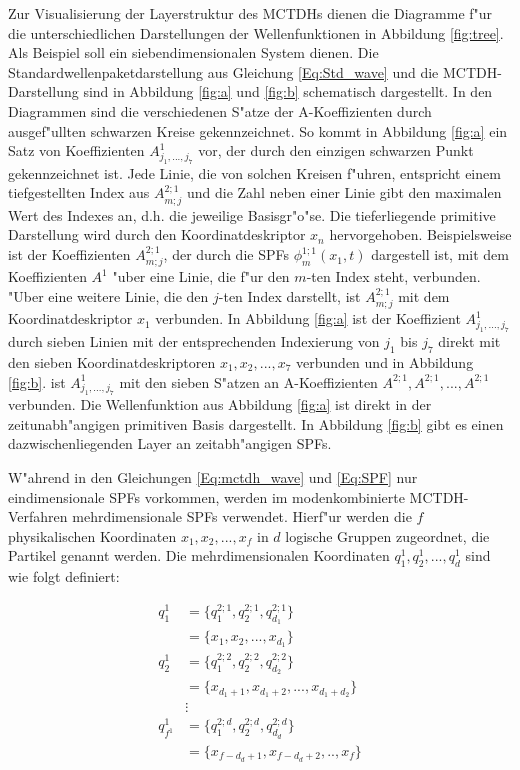 Zur Visualisierung der Layerstruktur des MCTDHs dienen die Diagramme f"ur die unterschiedlichen Darstellungen der Wellenfunktionen in Abbildung \ref{fig:tree}.
Als Beispiel soll ein siebendimensionalen System dienen.
Die Standardwellenpaketdarstellung aus Gleichung \ref{Eq:Std_wave} und die MCTDH-Darstellung sind in Abbildung \ref{fig:a} und \ref{fig:b} schematisch dargestellt.
In den Diagrammen sind die verschiedenen S"atze der A-Koeffizienten durch ausgef"ullten schwarzen Kreise gekennzei\-chnet.
So kommt in Abbildung \ref{fig:a} ein Satz von Koeffizienten $A^{1}_{j_{1}, ..., j_{7}}$ vor, der durch den
einzigen schwarzen Punkt gekennzei\-chnet ist. 
Jede Linie, die von solchen Kreisen f"uhren, entspricht einem tiefgestellten Index aus $ A^{2;1}_{m;j} $ und die Zahl neben einer Linie gibt den maximalen
Wert des Indexes an, d.h. die jeweilige Basisgr"o"se. Die tieferliegende primitive Darstellung wird durch den Koordinatdeskriptor $x_n$ hervorgehoben.
Beispielsweise ist der Koeffizienten $A^{2;1}_{m;j}$, der durch die SPFs $ \phi^{1;1}_{m} (x_{1}, t) $ dargestell ist, mit dem 
Koeffizienten $A^1$ "uber eine Linie, die f"ur den $m$-ten Index steht, verbunden. "Uber eine weitere Linie, die den $j$-ten Index darstellt,
ist  $A^{2;1}_{m;j}$ mit dem Koordinatdeskriptor $x_1$ verbunden.
In Abbildung \ref{fig:a} ist der Koeffizient $A^{1}_{j_{1}, ..., j_{7}}$  durch sieben Linien mit der entsprechenden Indexierung von 
$j_1$ bis $j_7$ direkt mit den sieben Koordinatdeskriptoren $x_1,x_2,...,x_7$ verbunden und in Abbildung \ref{fig:b}. ist $A^{1}_{j_{1}, ..., j_{7}}$
mit den sieben S"atzen an A-Koeffizienten $A^{2;1},A^{2;1},...,A^{2;1}$ verbunden.
Die Wellenfunktion aus Abbildung \ref{fig:a} ist direkt 
in der zeitunabh"angigen primitiven Basis dargestellt. In Abbildung \ref{fig:b} gibt es einen dazwischenliegenden Layer an zeitabh"angigen SPFs. 

W"ahrend in den Gleichungen \ref{Eq:mctdh_wave} und \ref{Eq:SPF} nur eindimensionale SPFs vorkommen, werden im modenkombinierte MCTDH-Verfahren
mehrdimensionale SPFs verwendet. 
Hierf"ur werden die $f$ physikalischen Koordinaten $x_{1}, x_{2}, ..., x_{f}$  in $d$ logische Gruppen zugeordnet, die Partikel genannt werden.
Die mehrdimensionalen Koordinaten $q^{1}_{1}, q^{1}_{2}, ..., q^{1}_{d}$ sind wie folgt definiert:


\begin{align*}
  q^{1}_{1} &= \{q^{2;1}_{1},q^{2;1}_{2},q^{2;1}_{d_{1}}\}\\ 
            &= \{x_{1}, x_{2}, ..., x_{d_1}\} \\
  q^{1}_{2} &= \{q^{2;2}_{1},q^{2;2}_{2},q^{2;2}_{d_{2}}\}\\ 
            &= \{x_{d_{1}+1}, x_{d_{1}+2}, ..., x_{d_{1}+d_{2}}\} \\
            &\vdots\\
  q^{1}_{f^1} &= \{q^{2;d}_{1},q^{2;d}_{2},q^{2;d}_{d_{d}}\} \\
            &= \{x_{f-d_d+1},x_{f-d_d+2},..,x_{f}\}
\end{align*}


